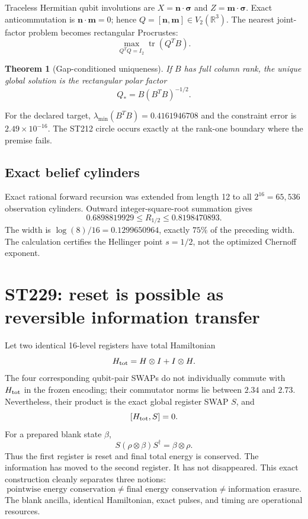 \documentclass[11pt,a4paper]{article}
\newcommand{\R}{\mathbb R}
\newcommand{\Tr}{\operatorname{tr}}
\newtheorem{theorem}{Theorem}[section]
\begin{document}
Traceless Hermitian qubit involutions are $X=\bm n\cdot\bm\sigma$ and
$Z=\bm m\cdot\bm\sigma$. Exact anticommutation is $\bm n\cdot\bm m=0$; hence
$Q=[\bm n,\bm m]\in V_2(\R^3)$. The nearest joint-factor problem becomes rectangular
Procrustes:
\[
\max_{Q^TQ=I_2}\Tr(Q^TB).
\]

\begin{theorem}[Gap-conditioned uniqueness]
If $B$ has full column rank, the unique global solution is the rectangular polar factor
\[
Q_*=B(B^TB)^{-1/2}.
\]
\end{theorem}

For the declared target, $\lambda_{\min}(B^TB)=0.4161946708$ and the constraint error is
$2.49\times10^{-16}$. The ST212 circle occurs exactly at the rank-one boundary where the
premise fails.

\subsection{Exact belief cylinders}

Exact rational forward recursion was extended from length 12 to all $2^{16}=65{,}536$
observation cylinders. Outward integer-square-root summation gives
\[
0.6898819929\le R_{1/2}\le0.8198470893.
\]
The width is $\log(8)/16=0.1299650964$, exactly $75\%$ of the preceding width. The
calculation certifies the Hellinger point $s=1/2$, not the optimized Chernoff exponent.

\section{ST229: reset is possible as reversible information transfer}

Let two identical 16-level registers have total Hamiltonian
\[
H_{\rm tot}=H\otimes I+I\otimes H.
\]
The four corresponding qubit-pair SWAPs do not individually commute with $H_{\rm tot}$ in
the frozen encoding; their commutator norms lie between $2.34$ and $2.73$. Nevertheless,
their product is the exact global register SWAP $S$, and
\[
[H_{\rm tot},S]=0.
\]
For a prepared blank state $\beta$,
\[
S(\rho\otimes\beta)S^\dagger=\beta\otimes\rho.
\]
Thus the first register is reset and final total energy is conserved. The information has
moved to the second register. It has not disappeared. This exact construction cleanly
separates three notions:
\[
\text{pointwise energy conservation}
\ne\text{final energy conservation}
\ne\text{information erasure}.
\]
The blank ancilla, identical Hamiltonian, exact pulses, and timing are operational resources.
\end{document}
